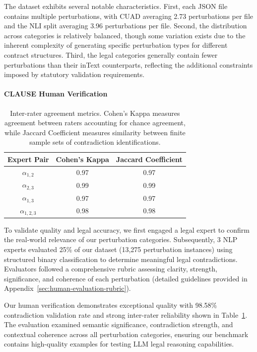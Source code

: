 \documentclass[11pt]{article}
\newcommand{\datasetName}{{\sc CLAUSE}\xspace}
\begin{document}
The dataset exhibits several notable characteristics. First, each JSON file contains multiple perturbations, with CUAD averaging 2.73 perturbations per file and the NLI split averaging 3.96 perturbations per file. Second, the distribution across categories is relatively balanced, though some variation exists due to the inherent complexity of generating specific perturbation types for different contract structures. Third, the legal categories generally contain fewer perturbations than their inText counterparts, reflecting the additional constraints imposed by statutory validation requirements.



\paragraph{\datasetName Human Verification}
\begin{table}[h]
\small
\centering
\begin{tabular}{ccc}
\toprule
\textbf{Expert Pair} & \textbf{Cohen's Kappa} & \textbf{Jaccard Coefficient} \\
\midrule
$\alpha_{1,2}$ & 0.97 & 0.97 \\
$\alpha_{2,3}$ & 0.99 & 0.99 \\
$\alpha_{1,3}$ & 0.97 & 0.97 \\
$\alpha_{1,2,3}$ & 0.98 & 0.98 \\
\bottomrule
\end{tabular}
\caption{Inter-rater agreement metrics. Cohen's Kappa measures agreement between raters accounting for chance agreement, while Jaccard Coefficient measures similarity between finite sample sets of contradiction identifications.}
\label{tab:agreement}
\end{table}
To validate quality and legal accuracy, we first engaged a legal expert to confirm the real-world relevance of our perturbation categories. Subsequently, 3 NLP experts evaluated 25\% of our dataset (13,275 perturbation instances) using structured binary classification to determine meaningful legal contradictions. Evaluators followed a comprehensive rubric assessing clarity, strength, significance, and coherence of each perturbation (detailed guidelines provided in Appendix~\ref{sec:human-evaluation-rubric}).

Our human verification demonstrates exceptional quality with 98.58\% contradiction validation rate and strong inter-rater reliability shown in Table~\ref{tab:agreement}. The evaluation examined semantic significance, contradiction strength, and contextual coherence across all perturbation categories, ensuring our benchmark contains high-quality examples for testing LLM legal reasoning capabilities.
\end{document}
